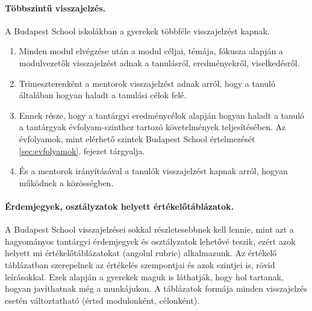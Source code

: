 \paragraph{Többszintű visszajelzés.} A Budapest School iskolákban a gyerekek többféle visszajelzést kapnak. \begin{enumerate}
\item Minden modul elvégzése után a modul céljai, témája, fókusza alapján a modulvezetők visszajelzést adnak a tanulásról, eredményekről, viselkedésről.
\item Trimeszterenként a mentorok visszajelzést adnak arról, hogy a tanuló általában hogyan haladt a tanulási célok felé.
\item Ennek része, hogy a tantárgyi eredménycélok alapján hogyan haladt a tanuló a tantárgyak évfolyam-szinthez tartozó követelmények teljesítésében. Az évfolyamok, mint elérhető szintek Budapest School értelmezését \ref{sec:evfolyamok}. fejezet tárgyalja.
\item És a mentorok irányításával a tanulók visszajelzést kapnak arról, hogyan működnek a közösségben.
\end{enumerate}

\paragraph{Érdemjegyek, osztályzatok helyett értékelőtáblázatok.} A Budapest School visszajelzései sokkal részletesebbnek kell lennie, mint azt a hagyományos tantárgyi érdemjegyek és osztályzatok lehetővé teszik, ezért azok helyett mi értékelőtáblázatokat (angolul rubric) alkalmazunk. Az értékelő táblázatban szerepelnek az értékelés szempontjai és azok szintjei is, rövid leírásokkal. Ezek alapján a gyerekek maguk is láthatják, hogy hol tartanak, hogyan javíthatnak még a munkájukon. A táblázatok formája minden visszajelzés esetén változtatható (értsd modulonként, célonként). 
